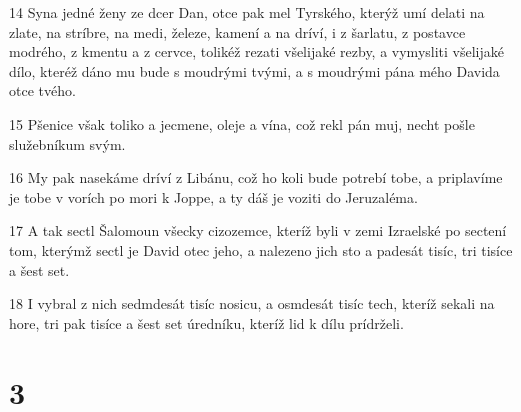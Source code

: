 \par 14 Syna jedné ženy ze dcer Dan, otce pak mel Tyrského, kterýž umí delati na zlate, na stríbre, na medi, železe, kamení a na dríví, i z šarlatu, z postavce modrého, z kmentu a z cervce, tolikéž rezati všelijaké rezby, a vymysliti všelijaké dílo, kteréž dáno mu bude s moudrými tvými, a s moudrými pána mého Davida otce tvého.
\par 15 Pšenice však toliko a jecmene, oleje a vína, což rekl pán muj, necht pošle služebníkum svým.
\par 16 My pak nasekáme dríví z Libánu, což ho koli bude potrebí tobe, a priplavíme je tobe v vorích po mori k Joppe, a ty dáš je voziti do Jeruzaléma.
\par 17 A tak sectl Šalomoun všecky cizozemce, kteríž byli v zemi Izraelské po sectení tom, kterýmž sectl je David otec jeho, a nalezeno jich sto a padesát tisíc, tri tisíce a šest set.
\par 18 I vybral z nich sedmdesát tisíc nosicu, a osmdesát tisíc tech, kteríž sekali na hore, tri pak tisíce a šest set úredníku, kteríž lid k dílu prídrželi.

\chapter{3}

